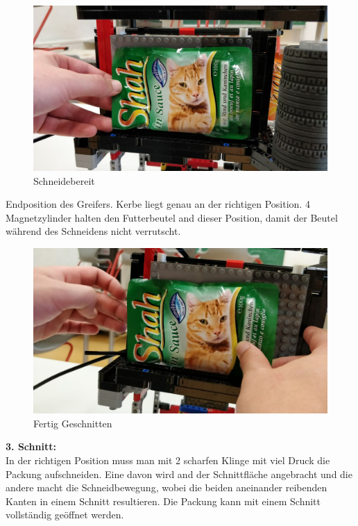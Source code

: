 \documentclass[a4paper,12pt]{scrartcl}
\begin{document}
\begin{figure}[H]
\begin{center}
\includegraphics[width=13cm]{Bilder/Ablauf_1_png/Schneidebereit.jpeg}
\caption{Schneidebereit}
\end{center}
\end{figure}

Endposition des Greifers. Kerbe liegt genau an der richtigen Position. 4 Magnetzylinder halten den Futterbeutel and dieser Position, damit der Beutel während des Schneidens nicht verrutscht.

\begin{figure}[H]
\begin{center}
\includegraphics[width=13cm]{Bilder/Ablauf_1_png/Fertig_Geschnitten}
\caption{Fertig Geschnitten}
\end{center}
\end{figure}


\textbf{3. Schnitt:} \\

In der richtigen Position muss man mit 2 scharfen Klinge mit viel Druck die Packung aufschneiden. Eine davon wird and der Schnittfläche angebracht und die andere macht die Schneidbewegung, wobei die beiden aneinander reibenden Kanten in einem Schnitt resultieren. Die Packung kann mit einem Schnitt vollständig geöffnet werden.
\end{document}
